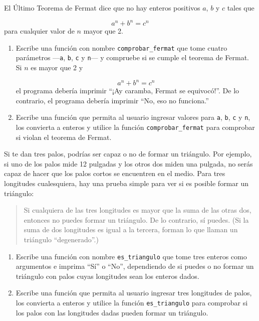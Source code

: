 \documentclass[10pt]{book}
\begin{document}
\begin{exercise}

El Último Teorema de Fermat dice que no hay enteros positivos
$a$, $b$ y $c$ tales que

\[ a^n + b^n = c^n \]
%
para cualquier valor de $n$ mayor que 2.

\begin{enumerate}

\item Escribe una función con nombre \verb"comprobar_fermat" que tome cuatro
parámetros ---{\tt a}, {\tt b}, {\tt c} y {\tt n}--- y
compruebe si se cumple el teorema de Fermat.  Si
$n$ es mayor que 2 y

\[a^n + b^n = c^n \]
%
el programa debería imprimir ``¡Ay caramba, Fermat se equivocó!''.
De lo contrario, el programa debería imprimir ``No, eso no funciona.''

\item Escribe una función que permita al usuario ingresar valores
para {\tt a}, {\tt b}, {\tt c} y {\tt n}, los convierta a
enteros y utilice la función \verb"comprobar_fermat" para comprobar si
violan el teorema de Fermat.

\end{enumerate}

\end{exercise}


\begin{exercise}

Si te dan tres palos, podrías ser capaz o no de formar
un triángulo.  Por ejemplo, si uno de los palos mide 12 pulgadas
y los otros dos miden una pulgada, no serás
capaz de hacer que los palos cortos se encuentren en el medio.  Para tres
longitudes cualesquiera, hay una prueba simple para ver si es posible formar
un triángulo:

\begin{quotation}
Si cualquiera de las tres longitudes es mayor que la suma de las otras
  dos, entonces no puedes formar un triángulo.  De lo contrario, sí
  puedes.  (Si la suma de dos longitudes es igual a la tercera, forman
    lo que llaman un triángulo ``degenerado''.)
\end{quotation}

\begin{enumerate}

\item Escribe una función con nombre \verb"es_triangulo" que tome tres
  enteros como argumentos e imprima ``Sí'' o ``No'', dependiendo
  de si puedes o no formar un triángulo con palos cuyas longitudes sean
  los enteros dados.

\item Escribe una función que permita al usuario ingresar tres longitudes de
  palos, los convierta a enteros y utilice la función \verb"es_triangulo" para
  comprobar si los palos con las longitudes dadas pueden formar un triángulo.

\end{enumerate}

\end{exercise}
\end{document}
